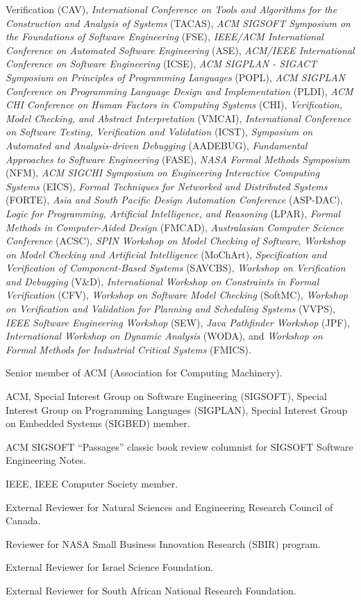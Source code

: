 \documentclass[ComputerScience]{vita}
\begin{document}
\begin{vita}
\begin{Professional Activities and Service}
{  Verification} (CAV), \emph{International Conference on Tools and Algorithms for the Construction and Analysis of Systems} (TACAS), \emph{ACM SIGSOFT Symposium on the Foundations of Software Engineering} (FSE), \emph{IEEE/ACM International Conference on Automated Software Engineering} (ASE), \emph{ACM/IEEE International Conference on Software Engineering} (ICSE), \emph{ACM SIGPLAN - SIGACT Symposium on Principles of Programming Languages} (POPL), \emph{ACM SIGPLAN Conference on Programming Language Design and Implementation} (PLDI), \emph{ACM CHI Conference on Human Factors in Computing Systems} (CHI), \emph{Verification, Model Checking, and Abstract Interpretation} (VMCAI), \emph{International Conference on Software Testing, Verification and Validation} (ICST), \emph{Symposium on Automated and Analysis-driven Debugging} (AADEBUG), \emph{Fundamental Approaches to Software Engineering} (FASE), \emph{NASA Formal Methods Symposium} (NFM), \emph{ACM SIGCHI Symposium on Engineering Interactive Computing Systems} (EICS), \emph{Formal Techniques for Networked and Distributed Systems} (FORTE), \emph{Asia and South Pacific Design Automation Conference} (ASP-DAC), \emph{Logic for Programming, Artificial Intelligence, and Reasoning} (LPAR), \emph{Formal Methods in Computer-Aided Design} (FMCAD), \emph{Australasian Computer Science Conference} (ACSC), \emph{SPIN Workshop on Model Checking of Software}, \emph{Workshop on Model Checking and Artificial Intelligence} (MoChArt), \emph{Specification and Verification of Component-Based Systems} (SAVCBS), \emph{Workshop on Verification and Debugging} (V\&D), \emph{International Workshop on Constraints in Formal Verification} (CFV), \emph{Workshop on Software Model Checking} (SoftMC), \emph{Workshop on Verification and Validation for Planning and Scheduling Systems} (VVPS), \emph{IEEE Software Engineering Workshop} (SEW), \emph{Java Pathfinder Workshop} (JPF), \emph{International Workshop on Dynamic Analysis} (WODA), and \emph{Workshop on Formal Methods for Industrial Critical Systems} (FMICS).
\item Senior member of ACM (Association for Computing Machinery).
  \item ACM, Special Interest Group on Software Engineering (SIGSOFT),
    Special Interest Group on Programming Languages (SIGPLAN), Special
    Interest Group on Embedded Systems (SIGBED) member.
\item ACM SIGSOFT ``Passages'' classic book review columnist for SIGSOFT Software Engineering Notes.
\item IEEE, IEEE Computer Society member.
\item External Reviewer for Natural Sciences and Engineering Research Council of Canada.
\item Reviewer for NASA Small Business Innovation Research (SBIR) program.
\item External Reviewer for Israel Science Foundation.
\item External Reviewer for South African National Research Foundation.
\end{Professional Activities and Service}


\end{vita}
\end{document}
